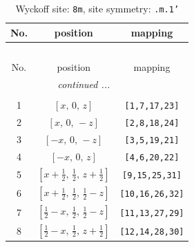 \documentclass[fleqn,8pt]{jsarticle}
\begin{document}
\begin{longtable}{ccc}
\caption{Wyckoff site: {\tt 8m}, site symmetry: {\tt .m.1'}}
 \\
 \hline \hline
No. & position & mapping \\ \hline \endfirsthead

\multicolumn{2}{l}{\tablename\ \thetable{}} \\
 \hline \hline
No. & position & mapping \\ \hline \endhead

 \hline \hline
\multicolumn{2}{r}{\footnotesize\it continued ...} \\ \endfoot

 \hline \hline
\multicolumn{2}{r}{} \\ \endlastfoot

1 & $\left[ x,\, 0,\, z \right]$ & {\tt [1,7,17,23]} \\ \hline
2 & $\left[ x,\, 0,\, - z \right]$ & {\tt [2,8,18,24]} \\ \hline
3 & $\left[ - x,\, 0,\, - z \right]$ & {\tt [3,5,19,21]} \\ \hline
4 & $\left[ - x,\, 0,\, z \right]$ & {\tt [4,6,20,22]} \\ \hline
5 & $\left[ x + \frac{1}{2},\, \frac{1}{2},\, z + \frac{1}{2} \right]$ & {\tt [9,15,25,31]} \\ \hline
6 & $\left[ x + \frac{1}{2},\, \frac{1}{2},\, \frac{1}{2} - z \right]$ & {\tt [10,16,26,32]} \\ \hline
7 & $\left[ \frac{1}{2} - x,\, \frac{1}{2},\, \frac{1}{2} - z \right]$ & {\tt [11,13,27,29]} \\ \hline
8 & $\left[ \frac{1}{2} - x,\, \frac{1}{2},\, z + \frac{1}{2} \right]$ & {\tt [12,14,28,30]} \\
\end{longtable}
\renewcommand{\arraystretch}{1.2}
\end{document}
